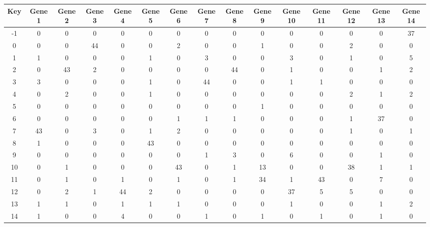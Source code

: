 \begin{tabular}{|c|c|c|c|c|c|c|c|c|c|c|c|c|c|c|}
\hline
Key & Gene 1 & Gene 2 & Gene 3 & Gene 4 & Gene 5 & Gene 6 & Gene 7 & Gene 8 & Gene 9 & Gene 10 & Gene 11 & Gene 12 & Gene 13 & Gene 14 \\
\hline
-1 & 0 & 0 & 0 & 0 & 0 & 0 & 0 & 0 & 0 & 0 & 0 & 0 & 0 & 37 \\
0 & 0 & 0 & 44 & 0 & 0 & 2 & 0 & 0 & 1 & 0 & 0 & 2 & 0 & 0 \\
1 & 1 & 0 & 0 & 0 & 1 & 0 & 3 & 0 & 0 & 3 & 0 & 1 & 0 & 5 \\
2 & 0 & 43 & 2 & 0 & 0 & 0 & 0 & 44 & 0 & 1 & 0 & 0 & 1 & 2 \\
3 & 3 & 0 & 0 & 0 & 1 & 0 & 44 & 0 & 0 & 1 & 1 & 0 & 0 & 0 \\
4 & 0 & 2 & 0 & 0 & 1 & 0 & 0 & 0 & 0 & 0 & 0 & 2 & 1 & 2 \\
5 & 0 & 0 & 0 & 0 & 0 & 0 & 0 & 0 & 1 & 0 & 0 & 0 & 0 & 0 \\
6 & 0 & 0 & 0 & 0 & 0 & 1 & 1 & 1 & 0 & 0 & 0 & 1 & 37 & 0 \\
7 & 43 & 0 & 3 & 0 & 1 & 2 & 0 & 0 & 0 & 0 & 0 & 1 & 0 & 1 \\
8 & 1 & 0 & 0 & 0 & 43 & 0 & 0 & 0 & 0 & 0 & 0 & 0 & 0 & 0 \\
9 & 0 & 0 & 0 & 0 & 0 & 0 & 1 & 3 & 0 & 6 & 0 & 0 & 1 & 0 \\
10 & 0 & 1 & 0 & 0 & 0 & 43 & 0 & 1 & 13 & 0 & 0 & 38 & 1 & 1 \\
11 & 0 & 1 & 0 & 1 & 0 & 1 & 0 & 1 & 34 & 1 & 43 & 0 & 7 & 0 \\
12 & 0 & 2 & 1 & 44 & 2 & 0 & 0 & 0 & 0 & 37 & 5 & 5 & 0 & 0 \\
13 & 1 & 1 & 0 & 1 & 1 & 1 & 0 & 0 & 0 & 1 & 0 & 0 & 1 & 2 \\
14 & 1 & 0 & 0 & 4 & 0 & 0 & 1 & 0 & 1 & 0 & 1 & 0 & 1 & 0 \\
\hline
\end{tabular}